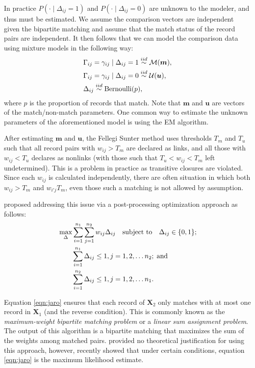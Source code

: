 \documentclass[12pt,letterpaper]{article}
\newcommand{\1}[1]{\mathbb{I}\!\left[#1\right]} %
\begin{document}
{In practice $P(\cdot \mid \Delta_{ij} = 1)$ and $P(\cdot \mid \Delta_{ij} = 0)$ are unknown to the modeler, and thus must be estimated. We assume the comparison vectors are independent given the bipartite matching and assume that the match status of the record pairs are independent. It then follows that we can model 
the comparison data using mixture models in the following way:
\begin{align}
	&\Gamma_{ij} = \gamma_{ij} \mid \Delta_{ij} = 1 \stackrel{iid}{\sim} \mathcal{M}(\bm{m}), \\
	&\Gamma_{ij} = \gamma_{ij} \mid \Delta_{ij} = 0  \stackrel{iid}{\sim} \mathcal{U}(\bm{u}), \notag\\
	& \Delta_{ij}   \stackrel{iid}{\sim} \text{Bernoulli}(p), \notag
\end{align}
where $p$ is the proportion of records that match. Note that $\bm{m}$ and $\bm{u}$ are vectors of the match/non-match parameters. One common way to estimate the unknown parameters of the aforementioned model is using the EM algorithm. 

After estimating $\bm{m}$ and $\bm{u}$, the Fellegi Sunter method uses thresholds $T_m$ and $T_u$ such that all record pairs with $w_{ij} > T_m$ are declared as links, and all those with $w_{ij} < T_u$ declares as nonlinks (with those such that $T_u < w_{ij} < T_m$ left undetermined). This is a problem in practice as transitive closures are violated. Since each $w_{ij}$ is calculated independently, there are often situation in which both $w_{ij} > T_m$ and $w_{i'j} T_m$, even those such a matching is not allowed by assumption. 

\cite{jaro1989} proposed addressing this issue via a post-processing optimization approach as follows:
\begin{align}
	\label{eqn:jaro}
	&\max_{\Delta} \sum_{i=1}^{n_1} \sum_{j=1}^{n_2} w_{ij} \Delta_{ij} 
	\quad \text{subject to} \quad \Delta_{ij} \in \{0,1\}; \\
	& \quad \quad \sum_{i=1}^{n_1}  \Delta_{ij}  \leq 1, j=1,2, \ldots n_2; \; \text{and} \notag\\
	& \quad \quad\sum_{i=1}^{n_2}  \Delta_{ij}  \leq 1, j=1,2, \ldots n_1. \notag
\end{align}

Equation \ref{eqn:jaro} ensures that each record of $\bm{X}_2$ only matches with at most one record in $\bm{X}_1$ (and the reverse condition). This is commonly known as the \emph{maximum-weight bipartite matching problem} or a \emph{linear sum assignment problem}. The output of this algorithm is a bipartite matching that maximizes the sum of the weights among matched pairs. \cite{jaro1989} provided no theoretical justification for using this approach, however, \cite{sadinle_bayesian_2017} recently showed that under certain conditions, equation \ref{eqn:jaro} is the maximum likelihood estimate. 



}
\end{document}
